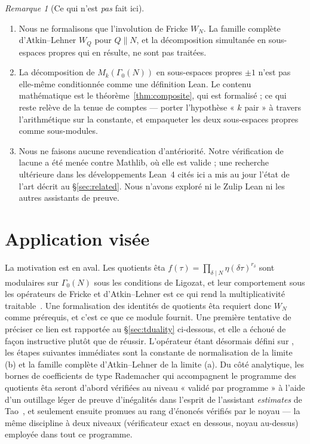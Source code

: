 \documentclass[11pt, a4paper]{article}
\newcommand{\lean}[1]{\ifmmode\text{\ttfamily\detokenize{#1}}\else{\ttfamily\detokenize{#1}}\fi}
\theoremstyle{remark}
\newtheorem{remark}[theorem]{Remarque}
\begin{document}
\begin{remark}[Ce qui n'est \emph{pas} fait ici]
\leavevmode
\begin{enumerate}[label=(\alph*)]
  \item Nous ne formalisons que l'involution de Fricke $W_N$. La famille complète d'Atkin--Lehner
        $W_Q$ pour $Q \| N$, et la décomposition simultanée en sous-espaces propres qui en résulte,
        ne sont pas traitées.
  \item La décomposition de $M_k(\Gamma_0(N))$ en sous-espaces propres $\pm 1$ n'est pas elle-même
        conditionnée comme une définition Lean. Le contenu mathématique est le
        théorème~\ref{thm:composite}, qui est formalisé ; ce qui reste relève de la tenue de
        comptes --- porter l'hypothèse « $k$ pair » à travers l'arithmétique \lean{zpow} sur la
        constante, et empaqueter les deux sous-espaces propres comme sous-modules.
  \item Nous ne faisons aucune revendication d'antériorité. Notre vérification de lacune a été
        menée contre Mathlib, où elle est valide ; une recherche ultérieure dans les développements
        Lean~4 cités ici a mis au jour l'état de l'art décrit au \S\ref{sec:related}. Nous n'avons
        exploré ni le Zulip Lean ni les autres assistants de preuve.
\end{enumerate}
\end{remark}

\section{Application visée}

La motivation est en aval. Les quotients êta
$f(\tau) = \prod_{\delta \mid N} \eta(\delta \tau)^{r_\delta}$ sont modulaires sur $\Gamma_0(N)$
sous les conditions de Ligozat, et leur comportement sous les opérateurs de Fricke et
d'Atkin--Lehner est ce qui rend la multiplicativité traitable~\cite{Martin1996}. Une formalisation
des identités de quotients êta requiert donc $W_N$ comme prérequis, et c'est ce que ce module
fournit. Une première tentative de préciser ce lien est rapportée au \S\ref{sec:tduality} ci-dessous, et
elle a échoué de façon instructive plutôt que de réussir. L'opérateur étant désormais défini sur \lean{ModularForm}, les
étapes suivantes immédiates sont la constante de normalisation de la limite (b) et la famille
complète d'Atkin--Lehner de la limite (a). Du côté analytique, les bornes de coefficients de type
Rademacher qui accompagnent le programme des quotients êta seront d'abord vérifiées au niveau
« validé par programme » à l'aide d'un outillage léger de preuve d'inégalités dans l'esprit de
l'assistant \emph{estimates} de Tao~\cite{TaoEstimates2025}, et seulement ensuite promues au rang
d'énoncés vérifiés par le noyau --- la même discipline à deux niveaux (vérificateur exact en
dessous, noyau au-dessus) employée dans tout ce programme.
\end{document}
